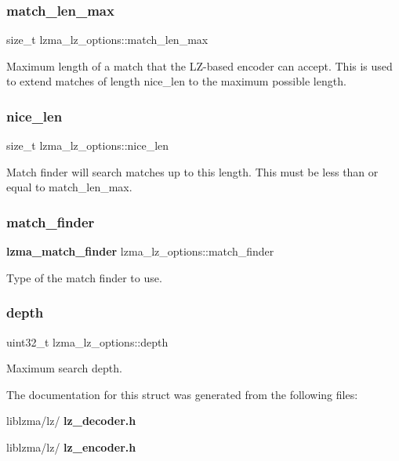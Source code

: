 \subsubsection{match\+\_\+len\+\_\+max}
{\footnotesize\ttfamily size\+\_\+t lzma\+\_\+lz\+\_\+options\+::match\+\_\+len\+\_\+max}

Maximum length of a match that the L\+Z-\/based encoder can accept. This is used to extend matches of length nice\+\_\+len to the maximum possible length. \mbox{\label{structlzma__lz__options_a932c109d9bc04a2abfd710b67fd65fba}} 
\subsubsection{nice\+\_\+len}
{\footnotesize\ttfamily size\+\_\+t lzma\+\_\+lz\+\_\+options\+::nice\+\_\+len}

Match finder will search matches up to this length. This must be less than or equal to match\+\_\+len\+\_\+max. \mbox{\label{structlzma__lz__options_ae68aa09d8094a22ae382a0bcf41a24d6}} 
\subsubsection{match\+\_\+finder}
{\footnotesize\ttfamily \textbf{ lzma\+\_\+match\+\_\+finder} lzma\+\_\+lz\+\_\+options\+::match\+\_\+finder}



Type of the match finder to use. 

\mbox{\label{structlzma__lz__options_a65f36545a297e0ecf4906528453ccc4a}} 
\subsubsection{depth}
{\footnotesize\ttfamily uint32\+\_\+t lzma\+\_\+lz\+\_\+options\+::depth}



Maximum search depth. 



The documentation for this struct was generated from the following files\+:\begin{DoxyCompactItemize}
\item 
liblzma/lz/\textbf{ lz\+\_\+decoder.\+h}\item 
liblzma/lz/\textbf{ lz\+\_\+encoder.\+h}\end{DoxyCompactItemize}
